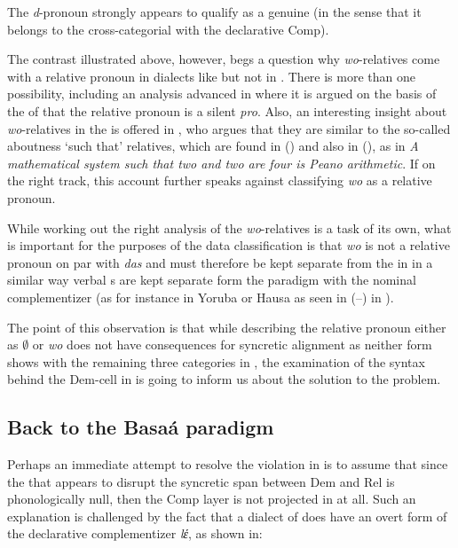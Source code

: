 The \textit{d}-pronoun strongly appears to qualify as a genuine  (in the sense that it belongs to the cross-categorial  with the declarative Comp).
\par
The contrast illustrated above, however, begs a question why \textit{wo}-relatives come with a relative pronoun in dialects like  but not in . 
There is more than one possibility, including an analysis advanced in \citet{PennerBader1995} where it is argued on the basis of the  of  that the relative pronoun is a silent \textit{pro}. Also, an interesting insight about \textit{wo}-relatives in the  is offered in \citet{vanR2003}, who argues that they are similar to the so-called aboutness `such that' relatives, which are found in  (\citealt[257]{Kuno1973}) and also in  (\citealt[157]{Grosu2002}), as in \textit{A mathematical system such that two and two are four is Peano arithmetic}. If on the right track, this account further speaks against classifying \textit{wo} as a relative pronoun.
\par
While working out the right analysis of the \textit{wo}-relatives is a task of its own, what is important for the purposes of the data classification is that \textit{wo} is not a relative pronoun on par with \textit{das} and must therefore be kept separate from the  in  in a similar way verbal s are kept separate form the paradigm with the nominal complementizer (as for instance in Yoruba or Hausa as seen in (--) in ).
\par
The point of this observation is that while describing the  relative pronoun either as $\emptyset$ or \textit{wo} does not have consequences for syncretic alignment as neither form shows  with the remaining three categories in , the examination of the syntax behind the Dem-cell in  is going to inform us about the solution to the  problem. 

\subsection{Back to the Basa\'a paradigm} 

Perhaps an immediate attempt to resolve the  violation in  is to assume that since the  that appears to disrupt the syncretic span between Dem and Rel is phonologically null, then the Comp layer is not projected in  at all. Such an explanation is challenged by the fact that a dialect of  does have an overt form of the declarative complementizer \textit{lέ}, as shown in: 

